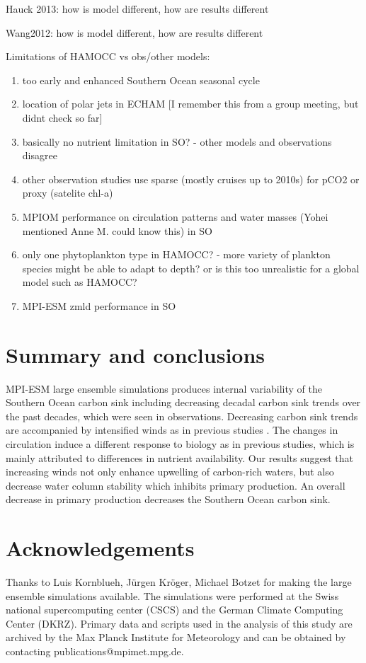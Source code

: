 \documentclass[12pt]{article}
\begin{document}
Hauck 2013: how is model different, how are results different

Wang2012: how is model different, how are results different

Limitations of HAMOCC vs obs/other models:
\begin{enumerate}
\item too early and enhanced Southern Ocean seasonal cycle \citep{Nevison2016}
\item location of polar jets in ECHAM [I remember this from a group meeting, but didnt check so far]
\item basically no nutrient limitation in SO? - other models and observations disagree
\item other observation studies use sparse (mostly cruises up to 2010s) for pCO2 or proxy (satelite chl-a)
\item MPIOM performance on circulation patterns and water masses (Yohei mentioned Anne M. could know this) in SO
\item only one phytoplankton type in HAMOCC? - more variety of plankton species might be able to adapt to depth? or is this too unrealistic for a global model such as HAMOCC?
\item MPI-ESM zmld performance in SO \citep{Sallee2013}
\end{enumerate} 



\section{Summary and conclusions}

MPI-ESM large ensemble simulations produces internal variability of the Southern Ocean carbon sink including decreasing decadal carbon sink trends over the past decades, which were seen in observations. Decreasing carbon sink trends are accompanied by intensified winds as in previous studies \citep{LeQuere2007,Lovenduski2008}. The changes in circulation induce a different response to biology as in previous studies\citep{Lovenduski2005,Hauck2013}, which is mainly attributed to differences in nutrient availability. Our results suggest that increasing winds not only enhance upwelling of carbon-rich waters, but also decrease water column stability which inhibits primary production. An overall decrease in primary production decreases the Southern Ocean carbon sink. 


\section*{Acknowledgements}
Thanks to Luis Kornblueh, J{\"u}rgen Kr{\"o}ger, Michael Botzet for making the large ensemble simulations available. The simulations were performed at the Swiss national supercomputing center (CSCS) and the German Climate Computing Center (DKRZ). Primary data and scripts used in the analysis of this study are archived by the Max Planck Institute for Meteorology and can be obtained by contacting publications@mpimet.mpg.de.
\end{document}
